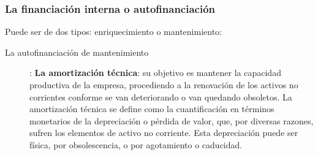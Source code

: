 \documentclass[10pt,a4paper,spanish]{report}
\begin{document}
            	\subsubsection{\textcolor[rgb]{0.4,0.7,0.4}La financiación interna o autofinanciación}

            		Puede ser de dos tipos: enriquecimiento o mantenimiento:

            		\begin{description}
            			\item[La autofinanciación de mantenimiento]: \textbf{La amortización técnica}: su objetivo es mantener la capacidad productiva de la empresa, procediendo a la renovación de los activos no corrientes conforme se van deteriorando o van quedando obsoletos. La amortización técnica se define como la cuantificación en términos monetarios de la depreciación o pérdida de valor, que, por diversas razones, sufren los elementos de activo no corriente. Esta depreciación puede ser física, por obsolescencia, o por agotamiento o caducidad.


\end{description}
\end{document}
